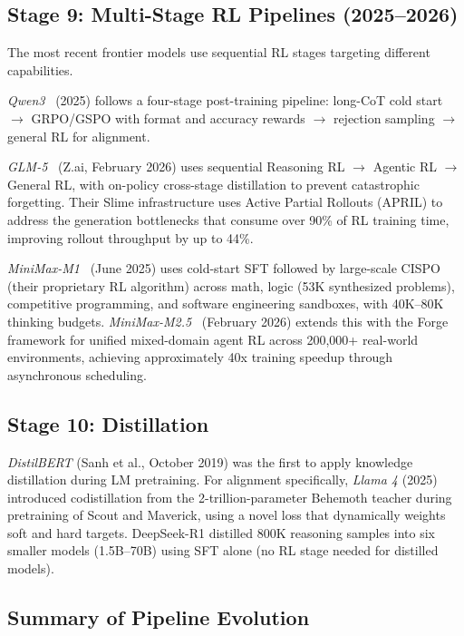 \documentclass[12pt]{article}
\begin{document}
\subsection{Stage 9: Multi-Stage RL Pipelines (2025--2026)}

The most recent frontier models use sequential RL stages targeting different capabilities.

\textit{Qwen3}~\cite{Qwen2025Qwen3} (2025) follows a four-stage post-training pipeline: long-CoT cold start $\rightarrow$ GRPO/GSPO with format and accuracy rewards $\rightarrow$ rejection sampling $\rightarrow$ general RL for alignment.

\textit{GLM-5}~\cite{GLM2025GLM5} (Z.ai, February 2026) uses sequential Reasoning RL $\rightarrow$ Agentic RL $\rightarrow$ General RL, with on-policy cross-stage distillation to prevent catastrophic forgetting. Their Slime infrastructure uses Active Partial Rollouts (APRIL) to address the generation bottlenecks that consume over 90\% of RL training time, improving rollout throughput by up to 44\%.

\textit{MiniMax-M1}~\cite{MiniMax2025M1} (June 2025) uses cold-start SFT followed by large-scale CISPO (their proprietary RL algorithm) across math, logic (53K synthesized problems), competitive programming, and software engineering sandboxes, with 40K--80K thinking budgets. \textit{MiniMax-M2.5}~\cite{MiniMax2025Forge} (February 2026) extends this with the Forge framework for unified mixed-domain agent RL across 200,000+ real-world environments, achieving approximately 40x training speedup through asynchronous scheduling.

\subsection{Stage 10: Distillation}

\textit{DistilBERT} (Sanh et al., October 2019) was the first to apply knowledge distillation during LM pretraining. For alignment specifically, \textit{Llama 4} (2025) introduced codistillation from the 2-trillion-parameter Behemoth teacher during pretraining of Scout and Maverick, using a novel loss that dynamically weights soft and hard targets. DeepSeek-R1 distilled 800K reasoning samples into six smaller models (1.5B--70B) using SFT alone (no RL stage needed for distilled models).

\subsection{Summary of Pipeline Evolution}
\end{document}
